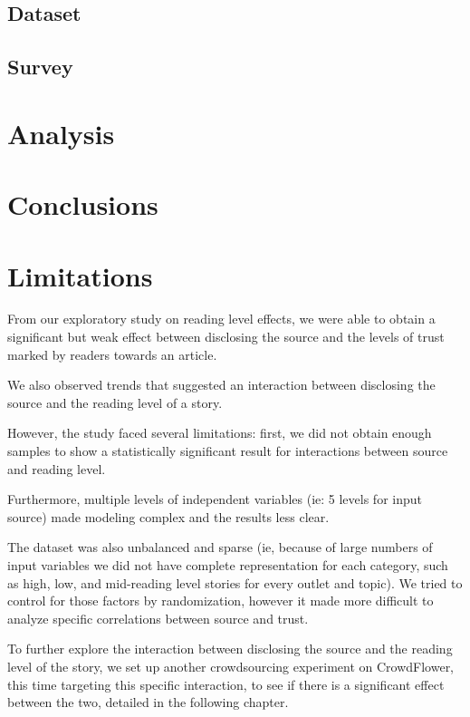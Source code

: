 \subsection{Dataset}
\subsection{Survey} 
\section{Analysis}
\section{Conclusions}

\section{Limitations}

From our exploratory study on reading level effects, we were able to obtain a significant but weak effect between disclosing the source and the levels of trust marked by readers towards an article.

We also observed trends that suggested an interaction between disclosing the source and the reading level of a story.

However, the study faced several limitations: first, we did not obtain enough samples to show a statistically significant result for interactions between source and reading level.

Furthermore, multiple levels of independent variables (ie: 5 levels for input source) made modeling complex and the results less clear.

The dataset was also unbalanced and sparse (ie, because of large numbers of input variables we did not have complete representation for each category, such as high, low, and mid-reading level stories for every outlet and topic). We tried to control for those factors by randomization, however it made more difficult to analyze specific correlations between source and trust.

To further explore the interaction between disclosing the source and the reading level of the story, we set up another crowdsourcing experiment on CrowdFlower, this time targeting this specific interaction, to see if there is a significant effect between the two, detailed in the following chapter.